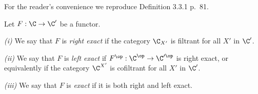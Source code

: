 \documentclass[12pt]{article}
\theoremstyle{remark}
\theoremstyle{definition}
\begin{document}
% 

For the reader's convenience we reproduce Definition 3.3.1 p.~81. 

\begin{df} 
Let $F:\C\to\C'$ be a functor.

\nn\emph{(i)} We say that $F$ is \emph{right exact} if the category $\C_{X'}$ is filtrant for all $X'$ in $\C'$. 

\nn\emph{(ii)} We say that $F$ is \emph{left exact} if $F^{\op}:\C^{\op}\to\C'^{\op}$ is right exact, or equivalently if the category $\C^{X'}$ is cofiltrant for all $X'$ in $\C'$.

\nn\emph{(iii)} We say that $F$ is \emph{exact} if it is both right and left exact.
\end{df}
\end{document}
